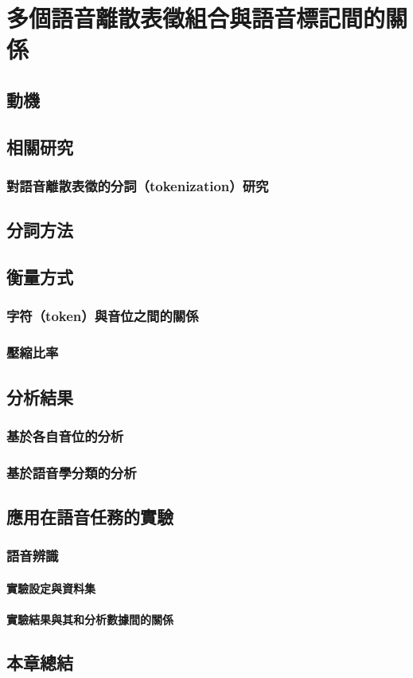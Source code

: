 \chapter{多個語音離散表徵組合與語音標記間的關係}
\section{動機}
\section{相關研究}
\subsection{對語音離散表徵的分詞（tokenization）研究}
\section{分詞方法}
\section{衡量方式}
\subsection{字符（token）與音位之間的關係}
\subsection{壓縮比率}
\section{分析結果}
\subsection{基於各自音位的分析}
\subsection{基於語音學分類的分析}\newpage
\section{應用在語音任務的實驗}
\subsection{語音辨識}
\subsubsection{實驗設定與資料集}
\subsubsection{實驗結果與其和分析數據間的關係}
\section{本章總結}
